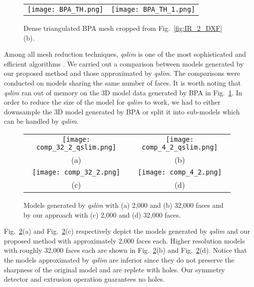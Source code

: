 \documentclass[10pt, conference, compsocconf]{IEEEtran}
\newcommand{\Fig}[1]{Fig.~\ref{fig:#1}}
\newcommand{\Figa}[1]{Fig.~\ref{fig:#1}(a)}
\newcommand{\Figb}[1]{Fig.~\ref{fig:#1}(b)}
\newcommand{\Figc}[1]{Fig.~\ref{fig:#1}(c)}
\newcommand{\Figd}[1]{Fig.~\ref{fig:#1}(d)}
\begin{document}
\begin{figure}[htbp]
\begin{center}
\begin{tabular}{cc}
\texttt{[image: BPA\_TH.png]} &
\texttt{[image: BPA\_TH\_1.png]}
\end{tabular}
\end{center}
\caption{Dense triangulated BPA mesh cropped from \Figb{IR_2_DXF}.}
\label{fig:TH_BPA}
\end{figure}

Among all mesh reduction techniques, {\it qslim} is one of the most
sophisticated and efficient algorithms \cite{BPA_GH}.
We carried out a comparison between models generated by our proposed
method and those approximated by {\it qslim}.
The comparisons were conducted on models sharing the same number of faces.
It is worth noting that {\it qslim} ran out of memory on the 3D model data
generated by BPA in \Fig{TH_BPA}.
In order to reduce the size of the model for {\it qslim} to work, we had
to either downsample the 3D model generated by BPA or split it into
sub-models which can be handled by {\it qslim}.

\begin{figure}[htbp]
\begin{center}
\begin{tabular}{cc}
\texttt{[image: comp\_32\_2\_qslim.png]} &
\texttt{[image: comp\_4\_2\_qslim.png]} \\
(a) & (b) \\
\texttt{[image: comp\_32\_2.png]} &
\texttt{[image: comp\_4\_2.png]} \\
(c) & (d)
\end{tabular}
\end{center}
\caption{
Models generated by {\it qslim} with (a) 2,000 and (b) 32,000 faces
and by our approach with (c) 2,000 and (d) 32,000 faces.}
\label{fig:TH_comp}
\end{figure}

\Figa{TH_comp} and \Figc{TH_comp} respectively depict the models generated
by {\it qslim} and our proposed method with approximately 2,000 faces each.
Higher resolution models with roughly 32,000 faces each are shown in
\Figb{TH_comp} and \Figd{TH_comp}.
Notice that the models approximated by {\it qslim} are inferior since they
do not preserve the sharpness of the original model and are replete with
holes. Our symmetry detector and extrusion operation guarantees no holes.
\end{document}
